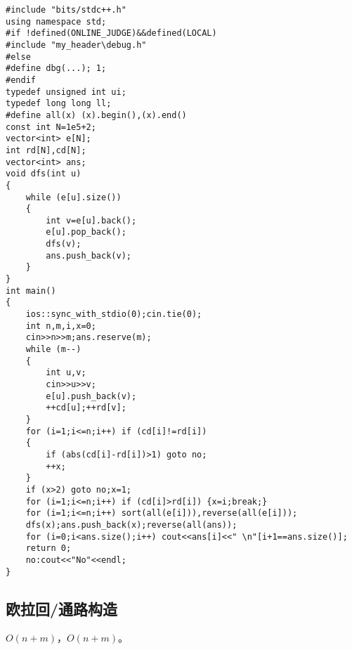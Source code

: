 \documentclass[12pt]{ctexart}
\begin{document}
\begin{lstlisting}
#include "bits/stdc++.h"
using namespace std;
#if !defined(ONLINE_JUDGE)&&defined(LOCAL)
#include "my_header\debug.h"
#else
#define dbg(...); 1;
#endif
typedef unsigned int ui;
typedef long long ll;
#define all(x) (x).begin(),(x).end()
const int N=1e5+2;
vector<int> e[N];
int rd[N],cd[N];
vector<int> ans;
void dfs(int u)
{
	while (e[u].size())
	{
		int v=e[u].back();
		e[u].pop_back();
		dfs(v);
		ans.push_back(v);
	}
}
int main()
{
	ios::sync_with_stdio(0);cin.tie(0);
	int n,m,i,x=0;
	cin>>n>>m;ans.reserve(m);
	while (m--)
	{
		int u,v;
		cin>>u>>v;
		e[u].push_back(v);
		++cd[u];++rd[v];
	}
	for (i=1;i<=n;i++) if (cd[i]!=rd[i])
	{
		if (abs(cd[i]-rd[i])>1) goto no;
		++x;
	}
	if (x>2) goto no;x=1;
	for (i=1;i<=n;i++) if (cd[i]>rd[i]) {x=i;break;}
	for (i=1;i<=n;i++) sort(all(e[i])),reverse(all(e[i]));
	dfs(x);ans.push_back(x);reverse(all(ans));
	for (i=0;i<ans.size();i++) cout<<ans[i]<<" \n"[i+1==ans.size()];
	return 0;
	no:cout<<"No"<<endl;
}
\end{lstlisting}

\subsection{欧拉回/通路构造}

$O(n+m)$，$O(n+m)$。
\end{document}
